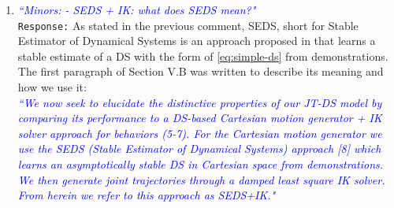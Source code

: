\documentclass{article}
\begin{document}
\begin{enumerate}
\item \textcolor{blue}{\textit{``Minors:
- SEDS + IK: what does SEDS mean?"}}\\
\texttt{Response:} As stated in the previous comment, SEDS, short for Stable Estimator of Dynamical Systems is an approach proposed in \cite{khansari2011learning} that learns a stable estimate of a DS with the form of \eqref{eq:simple-ds} from demonstrations. The first paragraph of Section V.B was written to describe its meaning and how we use it:\\
\textcolor{blue}{\small \textit{``We now seek to elucidate the distinctive properties of our JT-DS model by comparing its performance to a DS-based Cartesian motion generator + IK solver approach for behaviors \textit{(5-7)}. For the Cartesian motion generator we use the SEDS (Stable Estimator of Dynamical Systems) approach [8] which learns an asymptotically stable DS in Cartesian space from demonstrations. We then generate joint trajectories through a damped least square IK solver. From herein we refer to this approach as SEDS+IK."}}\\
\end{enumerate}
\end{document}
